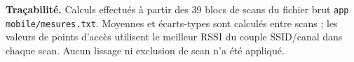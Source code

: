 \documentclass[10pt,a4paper]{article}
\begin{document}
\vfill
\begin{tcolorbox}[colback=paper,colframe=line,boxrule=.5pt,arc=2mm]
{\footnotesize\color{muted}\textbf{Traçabilité.} Calculs effectués à partir des 39 blocs de scans du fichier brut \texttt{app mobile/mesures.txt}. Moyennes et écarts-types sont calculés entre scans ; les valeurs de points d'accès utilisent le meilleur RSSI du couple SSID/canal dans chaque scan. Aucun lissage ni exclusion de scan n'a été appliqué.}
\end{tcolorbox}
\end{document}

